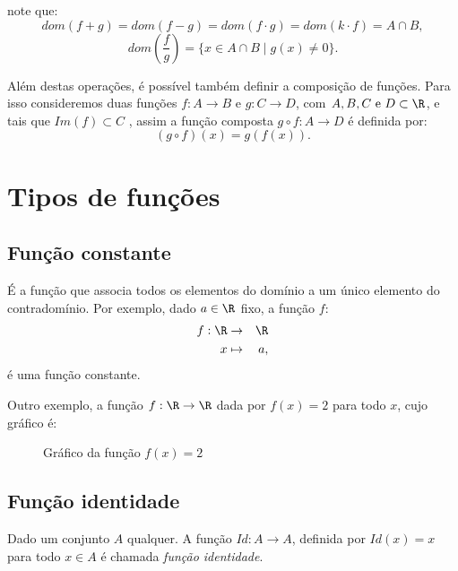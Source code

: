 note que:
\[dom(f+g)= dom(f-g)= dom(f \cdot g)= dom(k \cdot f)= A \cap B ,\]
\[ dom\left( \frac{f}{g} \right)= \{x \in A \cap B \mid g(x) \neq 0\}. \]

Além destas operações, é possível também definir a composição de funções. Para isso consideremos duas funções $f: A \rightarrow B$ e $g: C \rightarrow D$, com $A, B, C \text{ e } D \subset \R$, e tais que $Im(f) \subset C$ , assim a função composta $g \circ f: A \rightarrow D$ é definida por:
\[(g \circ f)(x)= g(f(x)). \]

\section{Tipos de funções}

\subsection{Função constante}

É a função que associa todos os elementos do domínio a um único elemento do contradomínio. Por exemplo, dado $a \in \R$ fixo, a função $f$:
\begin{eqnarray*}
 f: \R & \rightarrow & \R \\
 x & \mapsto & a,
\end{eqnarray*}
é uma função constante.

Outro exemplo, a função $f: \R \rightarrow \R$ dada por $f(x)= 2$ para todo $x$, cujo gráfico é:
\begin{figure}[H]
 \centering
    \caption{Gráfico da função $f(x)=2$}
  \end{figure}

\subsection{Função identidade}

Dado um conjunto $A$ qualquer. A função $Id: A \rightarrow A$, definida por $Id(x)= x$ para todo $x \in A$ é chamada \textit{função identidade}.

